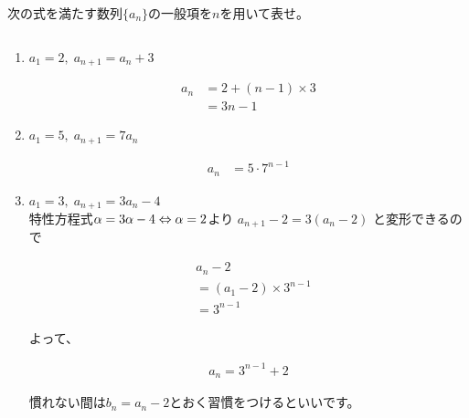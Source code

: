 \documentclass[a4paper]{ltjsarticle}
\newcommand{\flan}[1]{\begin{fleqn}[20pt]\begin{align*} #1 \end{align*}\end{fleqn}}
\begin{document}
\begin{question*}
次の式を満たす数列$\{a_n\}$の一般項を$n$を用いて表せ。
\begin{ans*}
${}$
\begin{enumerate}[label=\arabic*.]
  \item $a_1 = 2,\; a_{n+1} = a_n + 3 $\tousa
  \flan{
    a_n
    &= 2 + (n-1) \times 3 \\
    &= 3n - 1
  }
  \item $a_1 = 5,\; a_{n+1} = 7a_n$ \touhi
  \flan{
    a_n
    &= 5\cdot 7^{n-1}
  }
  \item $a_1 = 3,\; a_{n+1} = 3a_n -4$ \tokusyukai \\
  特性方程式${\alpha} = 3{\alpha} -4 \Leftrightarrow {\alpha} = 2$より
  $a_{n+1} - 2 = 3(a_n - 2)$ \touhi と変形できるので
  \flan{
    &a_n - 2 \\
    &= (a_1 - 2) \times 3^{n-1} \\
    &= 3^{n-1}
  }
  よって、
  \flan{
    a_n = 3^{n-1} + 2
  }
  \begin{supple*}
    慣れない間は$b_n = a_n - 2$とおく習慣をつけるといいです。
  \end{supple*}


\end{enumerate}
\end{ans*}
\end{question*}
\end{document}

